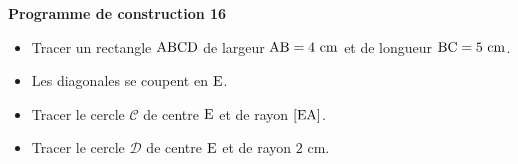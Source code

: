 \documentclass[exercice,a4]{thedocument}%
\begin{document}
%
\noindent\textbf{Programme de construction 16}\par\smallskip\noindent
\begin{itemize}
    \item Tracer un rectangle $\text{ABCD}$ de largeur
    $\text{AB}=4\text{ cm}$ et de longueur $\text{BC}=5\text{ cm}$.
    \item Les diagonales se coupent en $\text{E}$.
    \item Tracer le cercle $\mathcal{C}$ de centre $\text{E}$ et de
    rayon $[\text{EA}]$.
    \item Tracer le cercle $\mathcal{D}$ de centre $\text{E}$ et de
    rayon $2\text{ cm}$.
\end{itemize}
\end{document}
